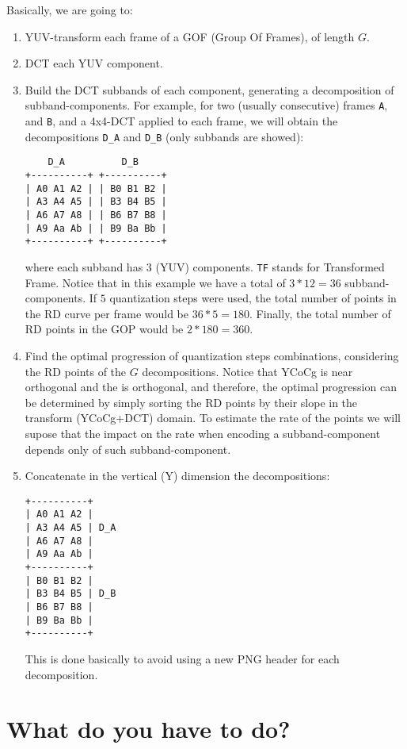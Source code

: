 Basically, we are going to:
\begin{enumerate}
\item YUV-transform each frame of a GOF (Group Of Frames), of length $G$.
\item DCT each YUV component.
\item Build the DCT subbands of each component, generating a
  decomposition of subband-components. For example, for two (usually
  consecutive) frames \verb|A|, and \verb|B|, and a 4x4-DCT applied to
  each frame, we will obtain the decompositions \verb|D_A| and
  \verb|D_B| (only subbands are showed):
\begin{verbatim}
    D_A          D_B
+----------+ +----------+
| A0 A1 A2 | | B0 B1 B2 |
| A3 A4 A5 | | B3 B4 B5 |
| A6 A7 A8 | | B6 B7 B8 |
| A9 Aa Ab | | B9 Ba Bb |
+----------+ +----------+
\end{verbatim}
  where each subband has 3 (YUV) components. \verb|TF| stands for
  Transformed Frame. Notice that in this example we have a total of
  $3*12=36$ subband-components. If $5$ quantization steps were used,
  the total number of points in the RD curve per frame would be
  $36*5=180$. Finally, the total number of RD points in the GOP would
  be $2*180=360$.

\item Find the optimal progression of quantization steps combinations,
  considering the RD points of the $G$ decompositions. Notice that
  YCoCg is near orthogonal and the is orthogonal, and therefore, the
  optimal progression can be determined by simply sorting the RD
  points by their slope in the transform (YCoCg+DCT) domain. To
  estimate the rate of the points we will supose that the impact on
  the rate when encoding a subband-component depends only of such
  subband-component.
  
\item Concatenate in the vertical (Y) dimension the decompositions:
\begin{verbatim}
+----------+
| A0 A1 A2 |
| A3 A4 A5 | D_A
| A6 A7 A8 | 
| A9 Aa Ab |
+----------+ 
| B0 B1 B2 |
| B3 B4 B5 | D_B
| B6 B7 B8 |
| B9 Ba Bb |
+----------+
\end{verbatim}
  This is done basically to avoid using a new PNG header for each
  decomposition.
\end{enumerate}

\section{What do you have to do?}

